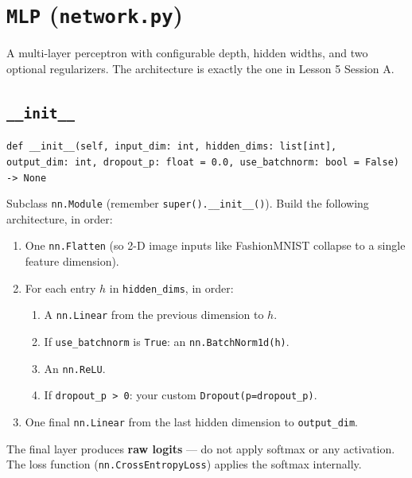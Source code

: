 \documentclass[11pt]{article}
\newcommand{\code}[1]{\texttt{\small #1}}
\begin{document}
\section{\texttt{MLP} (\texttt{network.py})}

A multi-layer perceptron with configurable depth, hidden widths, and two
optional regularizers. The architecture is exactly the one in Lesson 5
Session A.

\subsection{\texttt{\_\_init\_\_}}

\noindent
\code{def \_\_init\_\_(self, input\_dim: int, hidden\_dims: list[int],}\\
\code{\hspace*{2em}output\_dim: int, dropout\_p: float = 0.0, use\_batchnorm: bool = False) -> None}

\medskip\noindent
Subclass \code{nn.Module} (remember \code{super().\_\_init\_\_()}). Build the
following architecture, in order:

\begin{enumerate}
    \item One \code{nn.Flatten} (so 2-D image inputs like FashionMNIST
          collapse to a single feature dimension).
    \item For each entry $h$ in \code{hidden\_dims}, in order:
    \begin{enumerate}
        \item A \code{nn.Linear} from the previous dimension to $h$.
        \item If \code{use\_batchnorm} is \code{True}: an
              \code{nn.BatchNorm1d(h)}.
        \item An \code{nn.ReLU}.
        \item If \code{dropout\_p > 0}: your custom \code{Dropout(p=dropout\_p)}.
    \end{enumerate}
    \item One final \code{nn.Linear} from the last hidden dimension to
          \code{output\_dim}.
\end{enumerate}

The final layer produces \textbf{raw logits} --- do not apply softmax or any
activation. The loss function (\code{nn.CrossEntropyLoss}) applies the
softmax internally.
\end{document}
